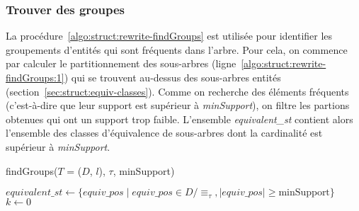 \subsubsection{Trouver des groupes}
La procédure~\ref{algo:struct:rewrite-findGroups} est utilisée pour identifier les groupements d'entités qui sont fréquents dans l'arbre.
Pour cela, on commence par calculer le partitionnement des sous-arbres (ligne~\ref{algo:struct:rewrite-findGroups:1}) qui se trouvent au-dessus des sous-arbres entités (section~\ref{sec:struct:equiv-classes}).
Comme on recherche des éléments fréquents (c'est-à-dire que leur support est supérieur à \emph{minSupport}), on filtre les partions obtenues qui ont un support trop faible.
L'ensemble \emph{equivalent\_st} contient alors l'ensemble des classes d'équivalence de sous-arbres dont la cardinalité est supérieur à \emph{minSupport}.

\begin{procedure}[htb]
    \caption{findGroups($T$ = ($D$, $l$), $\tau$, minSupport)}
    \label{algo:struct:rewrite-findGroups}

    $equivalent\_st \gets \{equiv\_pos \mid equiv\_pos \in D/\equiv_\tau, |equiv\_pos| \ge \text{minSupport}\}$ \label{algo:struct:rewrite-findGroups:1}\;
    $k \gets 0$\;

\end{procedure}

